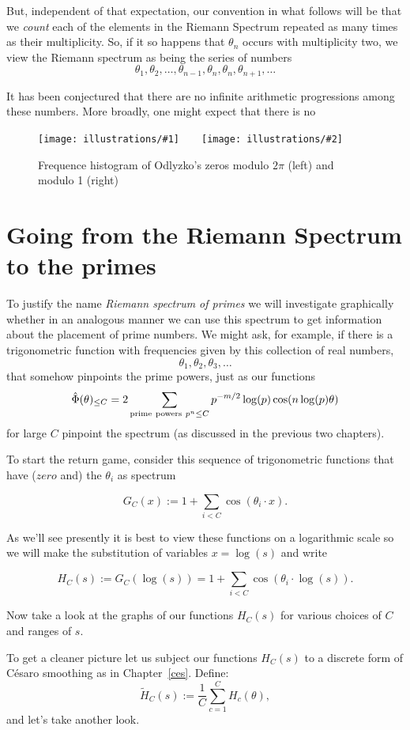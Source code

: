\documentclass[openany]{book}
\newcommand{\illtwo}[4]{%
   \begin{figure}[H]\centering%
   \texttt{[image: illustrations/\#1]}$\qquad$\texttt{[image: illustrations/\#2]}%
   \caption{#4}%
    \end{figure}}
\theoremstyle{plain}
\theoremstyle{definition}
\begin{document}
  But, independent of
that expectation, our convention in what follows will be that we {\it
  count} each of the elements in the Riemann Spectrum repeated as many
times as their multiplicity. So, if it so happens that $\theta_n$
occurs with multiplicity two, we view the Riemann spectrum as being
the series of numbers
  $$\theta_1, \theta_2, \dots, \theta_{n-1}, \theta_n, \theta_n, \theta_{n+1}, \dots$$

It has been conjectured that there are no infinite arithmetic progressions among these numbers.  More broadly, one might expect that there is no 

\illtwo{zero-spacing-mod2pi}{zero-spacing-mod1}{0.4}{Frequence histogram of Odlyzko's zeros modulo $2\pi$ (left) and modulo 1 (right)\label{fig:zero-spacing}}






\chapter{Going from the Riemann Spectrum to the primes}

To justify the name {\it Riemann spectrum of primes} we will
investigate graphically whether in an analogous manner we can use this
spectrum to get information about the placement of prime numbers. We
might ask, for example, if there is a trigonometric function with
frequencies given by this collection of real
numbers, $$\theta_1,\theta_2,\theta_3,\dots$$ that somehow pinpoints
the prime powers, just as our functions $${\hat \Phi}(\theta)_{\le C}=
2\sum_{{\rm prime\ powers\ } p^n \le C}
p^{-m/2}\log(p)\cos(n\log(p)\theta)$$ for large $C$ pinpoint the
spectrum (as discussed in the previous two chapters).

  To start the return game, consider this sequence of trigonometric functions that have ($zero$ and)  the $\theta_i$ as  spectrum

   $$G_C(x):= 1+ \sum_{i < C}\cos(\theta_i\cdot x).$$

    As we'll see  presently it is best to view these functions on a logarithmic scale so we will make the substitution of variables  $x = \log(s)$ and write

    $$H_C(s):= G_C(\log(s))= 1+ \sum_{i < C}\cos(\theta_i\cdot \log(s)).$$

    Now take a look at the graphs of our functions $H_C(s)$ for various choices of $C$ and ranges of $s$.


   To get a cleaner picture let us subject our functions $H_C(s)$ to a discrete form of C{\'e}saro smoothing as in Chapter~\ref{ces}. Define:
   $${\tilde H}_C(s) :=  {\frac{1}{C}}\sum_{c=1}^{C} H_c(\theta),$$ and let's take another look.
\end{document}
